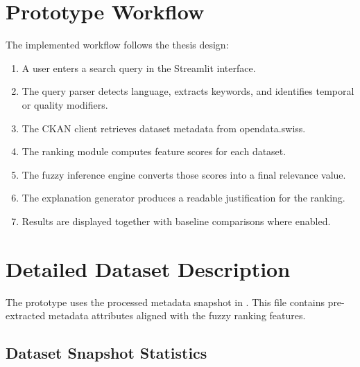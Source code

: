 \documentclass[11pt,a4paper]{article}
\begin{document}
\section{Prototype Workflow}

The implemented workflow follows the thesis design:

\begin{enumerate}[leftmargin=1.5em]
  \item A user enters a search query in the Streamlit interface.
  \item The query parser detects language, extracts keywords, and identifies temporal or quality modifiers.
  \item The CKAN client retrieves dataset metadata from opendata.swiss.
  \item The ranking module computes feature scores for each dataset.
  \item The fuzzy inference engine converts those scores into a final relevance value.
  \item The explanation generator produces a readable justification for the ranking.
  \item Results are displayed together with baseline comparisons where enabled.
\end{enumerate}

\section{Detailed Dataset Description}

The prototype uses the processed metadata snapshot in \texttt{}. This file contains pre-extracted metadata attributes aligned with the fuzzy ranking features.

\subsection{Dataset Snapshot Statistics}
\end{document}
